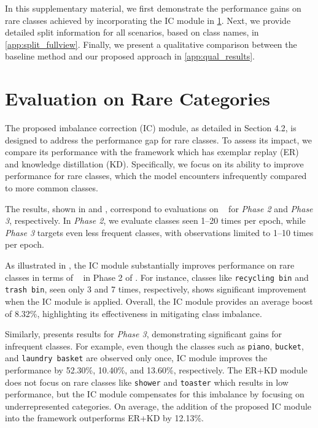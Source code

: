 \maketitlesupplementary

\appendix 
\renewcommand{\thesection}{Appendix \Alph{section}}

In this supplementary material, we first demonstrate the performance gains on rare classes achieved by incorporating the IC module in \ref{app:rare_eval}. Next, we provide detailed split information for all scenarios, based on class names, in \ref{app:split_fullview}. Finally, we present a qualitative comparison between the baseline method and our proposed approach in \ref{app:qual_results}.
% 

\section{Evaluation on Rare Categories}
\label{app:rare_eval}
The proposed imbalance correction (IC) module, as detailed in Section 4.2, is designed to address the performance gap for rare classes. To assess its impact, we compare its performance with the framework which has exemplar replay (ER) and knowledge distillation (KD). Specifically, we focus on its ability to improve performance for rare classes, which the model encounters infrequently compared to more common classes.



The results, shown in  and , correspond to evaluations on \fsplit~ for \textit{Phase 2} and \textit{Phase 3}, respectively. In \textit{Phase 2}, we evaluate classes seen 1–20 times per epoch, while \textit{Phase 3} targets even less frequent classes, with observations limited to 1–10 times per epoch. 

As illustrated in , the IC module substantially improves performance on rare classes in terms of \mapft~ in Phase 2 of \fsplit. For instance, classes like \texttt{recycling bin} and \texttt{trash bin}, seen only 3 and 7 times, respectively, shows significant improvement when the IC module is applied. Overall, the IC module provides an average boost of 8.32\%, highlighting its effectiveness in mitigating class imbalance.


Similarly,  presents results for \textit{Phase 3}, demonstrating significant gains for infrequent classes. For example, even though the classes such as \texttt{piano}, \texttt{bucket}, and \texttt{laundry basket} are observed only once, IC module improves the performance by 52.30\%, 10.40\%, and 13.60\%, respectively. The ER+KD module does not focus on rare classes like \texttt{shower} and \texttt{toaster} which results in low performance, but the IC module compensates for this imbalance by focusing on underrepresented categories. On average, the addition of the proposed IC module into the framework outperforms ER+KD by 12.13\%.

